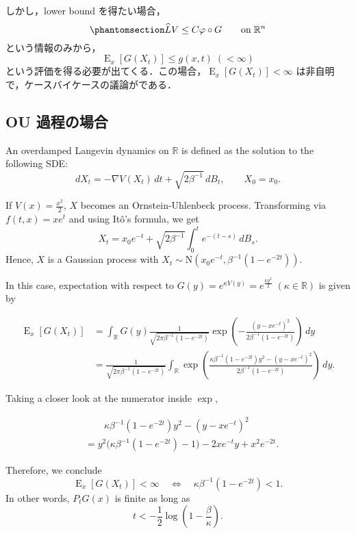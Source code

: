 \documentclass[
]{article}
\begin{document}
しかし，lower bound を得たい場合，
\begin{equation}\phantomsection\label{eq-drift-condition}{
\widehat{L}V\le C\varphi\circ G\qquad\mathrm{on}\;\mathbb{R}^n
}\end{equation} という情報のみから， \[
\operatorname{E}_x[G(X_t)]\le g(x,t)\;(<\infty)
\]
という評価を得る必要が出てくる．この場合，\(\operatorname{E}_x[G(X_t)]<\infty\)
は非自明で，ケースバイケースの議論がである．

\subsection{OU 過程の場合}\label{ou-ux904eux7a0bux306eux5834ux5408}

An overdamped Langevin dynamics on \(\mathbb{R}\) is defined as the
solution to the following SDE: \[
dX_t=-\nabla V(X_t)\,dt+\sqrt{2\beta^{-1}}\,dB_t,\qquad X_0=x_0.
\]

If \(V(x)=\frac{x^2}{2}\), \(X\) becomes an Ornstein-Uhlenbeck process.
Transforming via \(f(t,x)=xe^t\) and using Itô's formula, we get \[
X_t=x_0e^{-t}+\sqrt{2\beta^{-1}}\int^t_0e^{-(t-s)}\,dB_s.
\] Hence, \(X\) is a Gaussian process with
\(X_t\sim\mathrm{N}\left(x_0e^{-t},\beta^{-1}(1-e^{-2t})\right)\).

In this case, expectation with respect to
\(G(y)=e^{\kappa V(y)}=e^{\frac{\kappa y^2}{2}}\;(\kappa\in\mathbb{R})\)
is given by

\begin{align*}
    \operatorname{E}_x[G(X_t)]&=\int_{\mathbb{R}} G(y)\frac{1}{\sqrt{2\pi\beta^{-1}(1-e^{-2t})}}\exp\left(-\frac{(y-xe^{-t})^2}{2\beta^{-1}(1-e^{-2t})}\right)\,dy\\
    &=\frac{1}{\sqrt{2\pi\beta^{-1}(1-e^{-2t})}}\int_{\mathbb{R}}\exp\left(\frac{\kappa\beta^{-1}(1-e^{-2t})y^2-(y-xe^{-t})^2}{2\beta^{-1}(1-e^{-2t})}\right)\,dy.
\end{align*}

Taking a closer look at the numerator inside \(\exp\),

\begin{align*}
    &\qquad\kappa\beta^{-1}(1-e^{-2t})y^2-(y-xe^{-t})^2\\
    &=y^2\biggr(\kappa\beta^{-1}(1-e^{-2t})-1\biggl)-2xe^{-t}y+x^2e^{-2t}.
\end{align*}

Therefore, we conclude \[
\operatorname{E}_x[G(X_t)]<\infty\quad\Leftrightarrow\quad\kappa\beta^{-1}(1-e^{-2t})<1.
\] In other words, \(P_tG(x)\) is finite as long as \[
t<-\frac{1}{2}\log\left(1-\frac{\beta}{\kappa}\right).
\]
\end{document}
